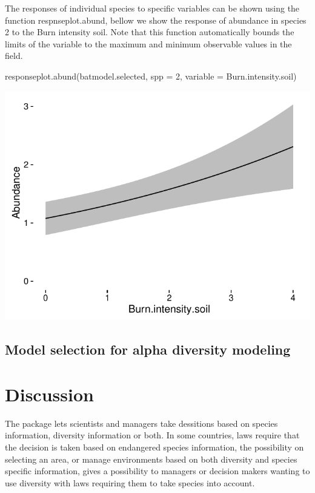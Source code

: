 \documentclass[article]{jss}
\begin{document}
The responses of individual species to specific variables can be shown
using the function respnseplot.abund, bellow we show the response of
abundance in species 2 to the Burn intensity soil. Note that this
function automatically bounds the limits of the variable to the maximum
and minimum observable values in the field.

\begin{CodeChunk}
\begin{CodeInput}
responseplot.abund(batmodel.selected, spp = 2, variable = Burn.intensity.soil)
\end{CodeInput}


\begin{center}\includegraphics{diversityocc_files/figure-latex/unnamed-chunk-16-1} \end{center}

\end{CodeChunk}

\subsection{Model selection for alpha diversity
modeling}\label{model-selection-for-alpha-diversity-modeling}

\section{Discussion}\label{discussion}

The  package lets scientists and managers take
dessitions based on species information, diversity information or both.
In some countries, laws require that the decision is taken based on
endangered species information, the possibility on selecting an area, or
manage environments based on both diversity and species specific
information, gives a possibility to managers or decision makers wanting
to use diversity with laws requiring them to take species into account.

\renewcommand\refname{References}

\end{document}
